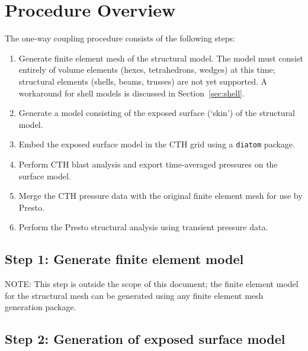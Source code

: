 \documentclass[11pt,twoside]{article}
\newcommand{\cmd}[1]
   {\mbox{\tt #1}\null}
\begin{document}
\section{Procedure Overview}
The one{}-way coupling procedure consists of the following steps:
\begin{enumerate}
\item
Generate finite element mesh of the structural model. The model must
consist entirely of volume elements (hexes, tetrahedrons, wedges) at
this time; structural elements (shells, beams, trusses) are not yet
supported. A workaround for shell models is discussed in Section~\ref{sec:shell}.

\item Generate a model consisting of the exposed surface (`skin') of the
structural model.

\item Embed the exposed surface model in the CTH grid using a \cmd{diatom} package.

\item Perform CTH blast analysis and export time{}-averaged pressures on the
surface model.

\item Merge the CTH pressure data with the original finite element mesh for
use by Presto.

\item Perform the Presto structural analysis using transient pressure data.
\end{enumerate}

\subsection{Step 1: Generate finite element model}
NOTE: This step is outside the scope of this document; the finite
element model for the structural mesh can be generated using any
finite element mesh generation package.


\subsection{Step 2:  Generation of exposed surface model}\label{sec:surfmodel}
\end{document}
